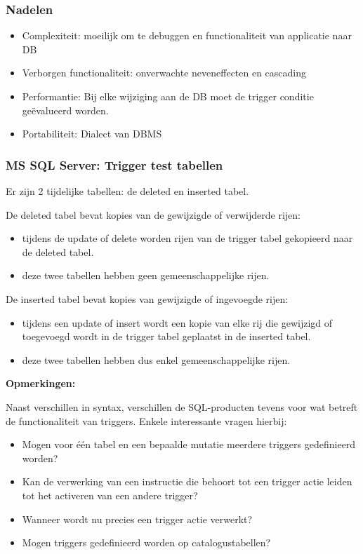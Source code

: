 \documentclass[a4paper,12pt]{article}
\begin{document}
\subsubsection{Nadelen}
\begin{itemize}
\item Complexiteit: moeilijk om te debuggen en functionaliteit van applicatie naar DB
\item Verborgen functionaliteit: onverwachte neveneffecten en cascading
\item Performantie: Bij elke wijziging aan de DB moet de trigger conditie geëvalueerd worden.
\item Portabiliteit: Dialect van DBMS
\end{itemize}

\subsubsection{MS SQL Server: Trigger test tabellen}
Er zijn 2 tijdelijke tabellen: de deleted en inserted tabel.

De deleted tabel bevat kopies van de gewijzigde of verwijderde rijen:
\begin{itemize}
\item tijdens de update of delete worden rijen van de trigger tabel gekopieerd naar de deleted tabel.
\item deze twee tabellen hebben geen gemeenschappelijke rijen.
\end{itemize}

De inserted tabel bevat kopies van gewijzigde of ingevoegde rijen:
\begin{itemize}
\item tijdens een update of insert wordt een kopie van elke rij die gewijzigd of toegevoegd wordt in de trigger tabel geplaatst in de inserted tabel.
\item deze twee tabellen hebben dus enkel gemeenschappelijke rijen.
\end{itemize}

\textbf{Opmerkingen:}

Naast verschillen in syntax, verschillen de SQL-producten tevens voor wat betreft de functionaliteit van triggers.
Enkele interessante vragen hierbij:
\begin{itemize}
\item Mogen voor één tabel en een bepaalde mutatie meerdere triggers gedefinieerd worden?
\item Kan de verwerking van een instructie die behoort tot een trigger actie leiden tot het activeren van een andere trigger?
\item Wanneer wordt nu precies een trigger actie verwerkt?
\item Mogen triggers gedefinieerd worden op catalogustabellen?
\end{itemize}
\end{document}
